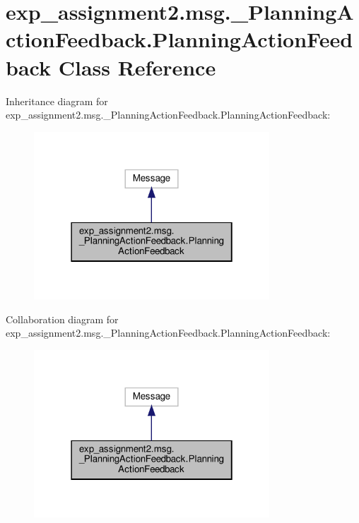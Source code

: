 \hypertarget{classexp__assignment2_1_1msg_1_1__PlanningActionFeedback_1_1PlanningActionFeedback}{}\section{exp\+\_\+assignment2.\+msg.\+\_\+\+Planning\+Action\+Feedback.\+Planning\+Action\+Feedback Class Reference}
\label{classexp__assignment2_1_1msg_1_1__PlanningActionFeedback_1_1PlanningActionFeedback}


Inheritance diagram for exp\+\_\+assignment2.\+msg.\+\_\+\+Planning\+Action\+Feedback.\+Planning\+Action\+Feedback\+:
\nopagebreak
\begin{figure}[H]
\begin{center}
\leavevmode
\includegraphics[width=250pt]{classexp__assignment2_1_1msg_1_1__PlanningActionFeedback_1_1PlanningActionFeedback__inherit__graph}
\end{center}
\end{figure}


Collaboration diagram for exp\+\_\+assignment2.\+msg.\+\_\+\+Planning\+Action\+Feedback.\+Planning\+Action\+Feedback\+:
\nopagebreak
\begin{figure}[H]
\begin{center}
\leavevmode
\includegraphics[width=250pt]{classexp__assignment2_1_1msg_1_1__PlanningActionFeedback_1_1PlanningActionFeedback__coll__graph}
\end{center}
\end{figure}
